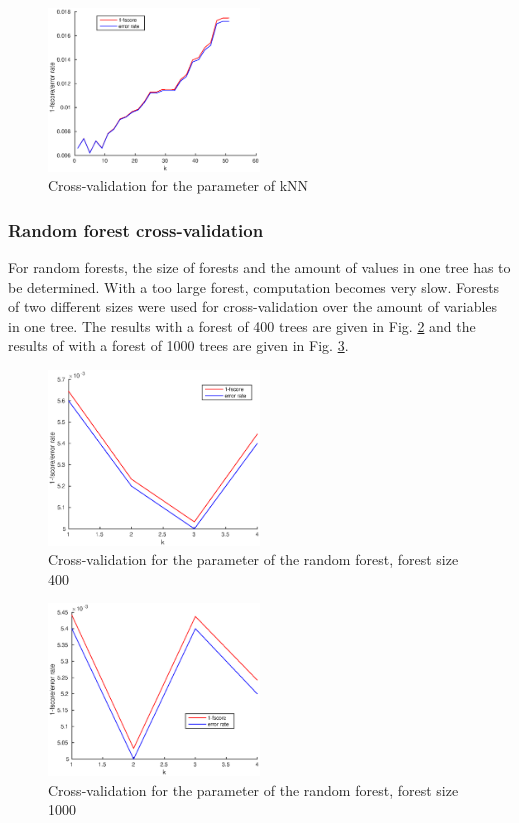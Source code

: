 \documentclass[twoside]{article}
\begin{document}
\begin{multicols}{2}
\begin{figure}[H]
\centering
\includegraphics[width=0.5\textwidth]{knncrossval}
\caption{Cross-validation for the parameter of kNN}
\label{fig:knncrossval}
\end{figure}

\subsubsection{Random forest cross-validation}

For random forests, the size of forests and the amount of values in one tree has to be determined.
With a too large forest, computation becomes very slow. Forests of two different sizes were used
for cross-validation over the amount of variables in one tree. The results with a forest of 400
trees are given in Fig. \ref{fig:RF400crossval} and the results of with a forest of 1000 trees
are given in Fig. \ref{fig:RF1000crossval}.

\begin{figure}[H]
\centering
\includegraphics[width=0.5\textwidth]{randforcrossval400}
\caption{Cross-validation for the parameter of the random forest, forest size 400}
\label{fig:RF400crossval}
\end{figure}

\begin{figure}[H]
\centering
\includegraphics[width=0.5\textwidth]{randforcrossval1000}
\caption{Cross-validation for the parameter of the random forest, forest size 1000}
\label{fig:RF1000crossval}
\end{figure}


\end{multicols}
\end{document}
